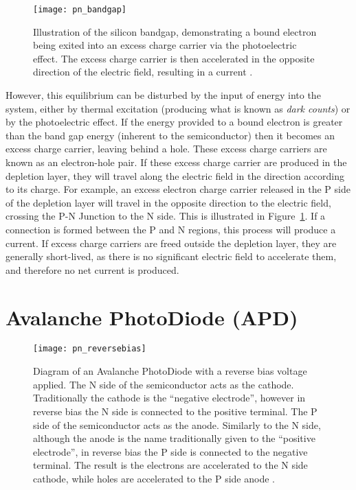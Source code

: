 \begin{figure}
	\centering
    \texttt{[image: pn\_bandgap]} 
	\caption[Illustration of the silicon bandgap.]{Illustration of the silicon bandgap, demonstrating a bound electron being exited into an excess charge carrier via the photoelectric effect. The excess charge carrier is then accelerated in the opposite direction of the electric field, resulting in a current \cite{Ghassemi2017}.}
	\label{fig:pn_bandgap}
\end{figure}

However, this equilibrium can be disturbed by the input of energy into the system, either by thermal excitation (producing what is known as \textit{dark counts}) or by the photoelectric effect. If the energy provided to a bound electron is greater than the band gap energy (inherent to the semiconductor) then it becomes an excess charge carrier, leaving behind a hole. These excess charge carriers are known as an electron-hole pair. If these excess charge carrier are produced in the depletion layer, they will travel along the electric field in the direction according to its charge. For example, an excess electron charge carrier released in the P side of the depletion layer will travel in the opposite direction to the electric field, crossing the P-N Junction to the N side. This is illustrated in Figure~\ref{fig:pn_bandgap}. If a connection is formed between the P and N regions, this process will produce a current. If excess charge carriers are freed outside the depletion layer, they are generally short-lived, as there is no significant electric field to accelerate them, and therefore no net current is produced.

\section{Avalanche PhotoDiode (APD)}

\begin{figure}
	\centering
    \texttt{[image: pn\_reversebias]} 
	\caption[Diagram of an Avalanche PhotoDiode.]{Diagram of an Avalanche PhotoDiode with a reverse bias voltage applied. The N side of the semiconductor acts as the cathode. Traditionally the cathode is the ``negative electrode'', however in reverse bias the N side is connected to the positive terminal. The P side of the semiconductor acts as the anode. Similarly to the N side, although the anode is the name traditionally given to the ``positive electrode'', in reverse bias the P side is connected to the negative terminal. The result is the electrons are accelerated to the N side cathode, while holes are accelerated to the P side anode \cite{Ghassemi2017}.}
	\label{fig:pn_reversebias}
\end{figure}

